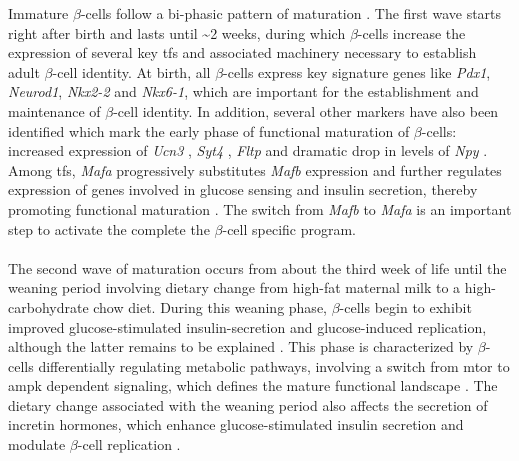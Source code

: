 \par Immature $\beta$-cells follow a bi-phasic pattern of maturation \textbf{\cite{salinno_-cell_2019, stolovich-rain_weaning_2015}}. The first wave starts right after birth and lasts until \textasciitilde 2 weeks, during which $\beta$-cells increase the expression of several key \glspl{tf} and associated machinery necessary to establish adult $\beta$-cell identity. At birth, all $\beta$-cells express key signature genes like \textit{Pdx1}, \textit{Neurod1}, \textit{Nkx2-2} and \textit{Nkx6-1}, which are important for the establishment and maintenance of $\beta$-cell identity. In addition, several other markers have also been identified which mark the early phase of functional maturation of $\beta$-cells: increased expression of \textit{Ucn3} \textbf{\cite{salinno_-cell_2019, blum_functional_2012}}, \textit{Syt4} \textbf{\cite{salinno_-cell_2019, huang_synaptotagmin_2018}}, \textit{Fltp} \textbf{\cite{salinno_-cell_2019, bader_identification_2016}}  and dramatic drop in levels of \textit{Npy} \textbf{\cite{salinno_-cell_2019, rodnoi_neuropeptide_2017}}. Among \glspl{tf}, \textit{Mafa} progressively substitutes \textit{Mafb} expression and further regulates expression of genes involved in glucose sensing and insulin secretion, thereby promoting functional maturation \textbf{\cite{salinno_-cell_2019}}. The switch from \textit{Mafb} %
to \textit{Mafa} is an important step to activate the complete the $\beta$-cell specific program.
\\\\
The second wave of maturation occurs from about the third week of life until the weaning period involving dietary change from high-fat maternal milk to a high-carbohydrate chow diet. During this weaning phase, $\beta$-cells begin to exhibit improved glucose-stimulated insulin-secretion and glucose-induced replication, although the latter remains to be explained \textbf{\cite{salinno_-cell_2019,stolovich-rain_weaning_2015}}. This phase is characterized by $\beta$-cells differentially regulating metabolic pathways, involving a switch from \gls{mtor} to \gls{ampk} dependent signaling, which defines the mature functional landscape \textbf{\cite{salinno_-cell_2019,jaafar_mtorc1_2019}}. The dietary change associated with the weaning period also affects the secretion of incretin hormones, which enhance glucose-stimulated insulin secretion and modulate $\beta$-cell replication \textbf{\cite{campbell_pharmacology_2013}}.



